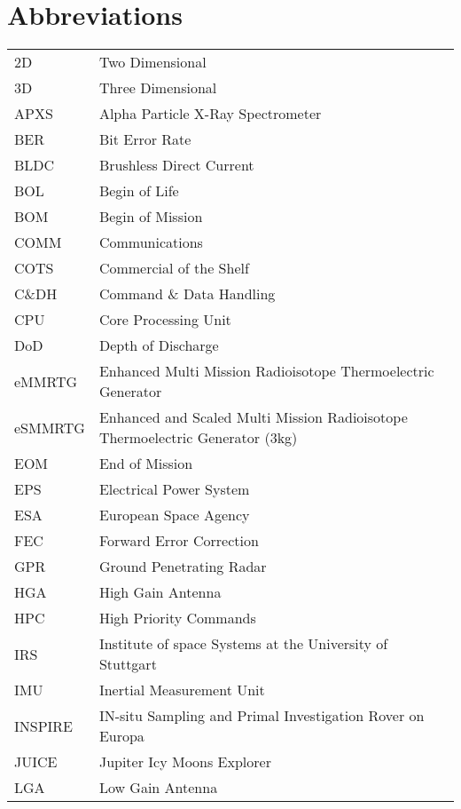\chapter*{Abbreviations}


\vspace{-0.5cm}

\begin{longtable}[l]{ll}

2D		& Two Dimensional \\
3D		& Three Dimensional \\
APXS	& Alpha Particle X-Ray Spectrometer \\
BER		& Bit Error Rate \\
BLDC	& Brushless Direct Current	\\
BOL     & Begin of Life \\
BOM     & Begin of Mission \\
COMM    & Communications \\
COTS	& Commercial of the Shelf \\
C\&DH	& Command \& Data Handling \\
CPU		& Core Processing Unit \\
DoD     & Depth of Discharge \\
eMMRTG  & Enhanced Multi Mission Radioisotope Thermoelectric Generator \\
eSMMRTG & Enhanced and Scaled Multi Mission Radioisotope Thermoelectric Generator (3kg) \\
EOM     & End of Mission \\
EPS     & Electrical Power System \\
ESA		& European Space Agency	\\
FEC		& Forward Error Correction \\
GPR		& Ground Penetrating Radar \\
HGA	    & High Gain Antenna \\
HPC     & High Priority Commands \\
IRS     & Institute of space Systems at the University of Stuttgart \\
IMU     & Inertial Measurement Unit \\
INSPIRE & IN-situ Sampling and Primal Investigation Rover on Europa \\
JUICE 	& Jupiter Icy Moons Explorer \\
LGA		& Low Gain Antenna \\

\end{longtable}
